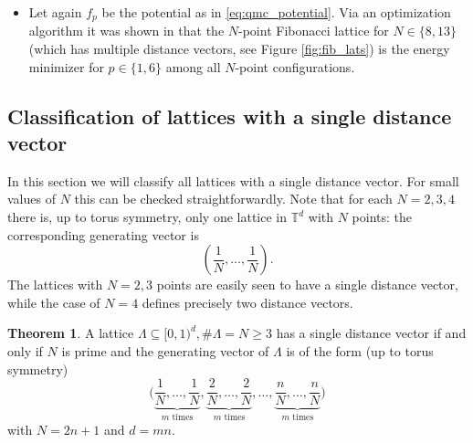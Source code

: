 \documentclass[a4paper,12pt]{article}
\numberwithin{equation}{section}
\theoremstyle{definition}
\newtheorem{thm}{Theorem}[section]
\newcommand{\bbT}{\mathbb{T}}
\newcommand{\sbse}{\subseteq}
\begin{document}
\begin{itemize}

\item Let again $f_p$ be the potential as in \eqref{eq:qmc_potential}. Via an optimization algorithm it was shown in \cite{HO16} that the $N$-point Fibonacci lattice for $N \in \{8, 13\}$ (which has multiple distance vectors, see Figure \ref{fig:fib_lats}) is the energy minimizer for $p \in \{1, 6\}$ among all $N$-point configurations.

    \end{itemize}



\subsection{Classification of lattices with a single distance vector}

In this section we will classify all lattices with a single distance vector. For small values of $N$ this can be checked straightforwardly. Note that for each $N=2, 3, 4$  there is, up to torus symmetry,  %
 only one lattice in $\bbT^d$ with $N$ points:   the corresponding generating vector is 
$$
\left(\frac1N, \dots, \frac1N\right).
$$
The lattices with $N=2, 3$ points are easily seen to %
have a single distance vector, while the case of $N=4$ defines precisely two distance vectors. %

\begin{thm} \label{thm:unique_dist_lat}
    A lattice $\Lambda \sbse [0, 1)^d, \#\Lambda = N \geq 3$ has a single distance vector %
    if and only if $N$ is prime and the generating vector of $\Lambda$ is of the form (up to torus symmetry)
    $$
    \bigg(\underbrace{\frac1N, \dots, \frac1N}_{m \text{ times}}, \underbrace{\frac2N, \dots, \frac2N}_{m \text{ times}}, \dots, \underbrace{\frac nN, \dots, \frac nN}_{m \text{ times}}\bigg)
    $$
    with $N = 2n+1$ and $d = mn$.
\end{thm}
\end{document}
